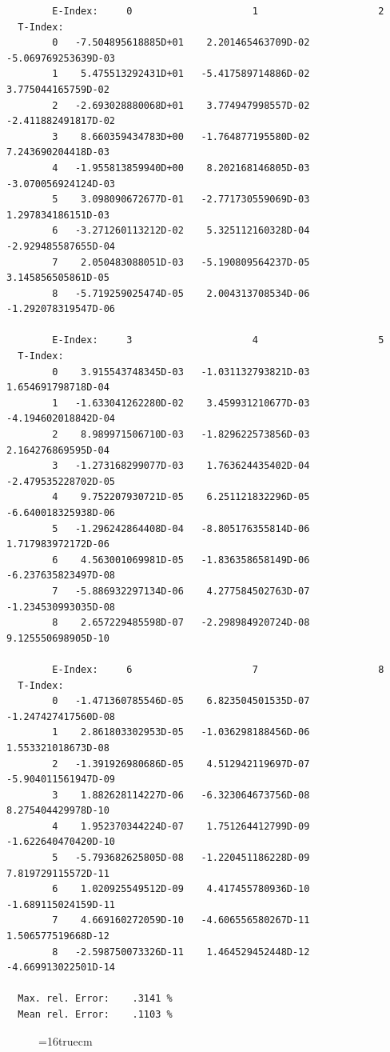 \documentclass[12pt,dvips]{article}
\begin{document}
\begin{small}\begin{verbatim}
        E-Index:     0                     1                     2
  T-Index:
        0   -7.504895618885D+01    2.201465463709D-02   -5.069769253639D-03
        1    5.475513292431D+01   -5.417589714886D-02    3.775044165759D-02
        2   -2.693028880068D+01    3.774947998557D-02   -2.411882491817D-02
        3    8.660359434783D+00   -1.764877195580D-02    7.243690204418D-03
        4   -1.955813859940D+00    8.202168146805D-03   -3.070056924124D-03
        5    3.098090672677D-01   -2.771730559069D-03    1.297834186151D-03
        6   -3.271260113212D-02    5.325112160328D-04   -2.929485587655D-04
        7    2.050483088051D-03   -5.190809564237D-05    3.145856505861D-05
        8   -5.719259025474D-05    2.004313708534D-06   -1.292078319547D-06

        E-Index:     3                     4                     5
  T-Index:
        0    3.915543748345D-03   -1.031132793821D-03    1.654691798718D-04
        1   -1.633041262280D-02    3.459931210677D-03   -4.194602018842D-04
        2    8.989971506710D-03   -1.829622573856D-03    2.164276869595D-04
        3   -1.273168299077D-03    1.763624435402D-04   -2.479535228702D-05
        4    9.752207930721D-05    6.251121832296D-05   -6.640018325938D-06
        5   -1.296242864408D-04   -8.805176355814D-06    1.717983972172D-06
        6    4.563001069981D-05   -1.836358658149D-06   -6.237635823497D-08
        7   -5.886932297134D-06    4.277584502763D-07   -1.234530993035D-08
        8    2.657229485598D-07   -2.298984920724D-08    9.125550698905D-10

        E-Index:     6                     7                     8
  T-Index:
        0   -1.471360785546D-05    6.823504501535D-07   -1.247427417560D-08
        1    2.861803302953D-05   -1.036298188456D-06    1.553321018673D-08
        2   -1.391926980686D-05    4.512942119697D-07   -5.904011561947D-09
        3    1.882628114227D-06   -6.323064673756D-08    8.275404429978D-10
        4    1.952370344224D-07    1.751264412799D-09   -1.622640470420D-10
        5   -5.793682625805D-08   -1.220451186228D-09    7.819729115572D-11
        6    1.020925549512D-09    4.417455780936D-10   -1.689115024159D-11
        7    4.669160272059D-10   -4.606556580267D-11    1.506577519668D-12
        8   -2.598750073326D-11    1.464529452448D-12   -4.669913022501D-14

  Max. rel. Error:    .3141 %
  Mean rel. Error:    .1103 %

\end{verbatim}\end{small}
\begin{figure} \label{2.2C}
\epsfxsize=16truecm
\end{figure}
\newpage
\end{document}
